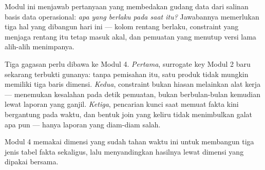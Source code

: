 Modul ini menjawab pertanyaan yang membedakan gudang data dari salinan basis
data operasional: \emph{apa yang berlaku pada saat itu?} Jawabannya memerlukan
tiga hal yang dibangun hari ini --- kolom rentang berlaku, constraint yang
menjaga rentang itu tetap masuk akal, dan pemuatan yang menutup versi lama alih-alih
menimpanya.

Tiga gagasan perlu dibawa ke Modul 4. \emph{Pertama}, surrogate key Modul 2 baru
sekarang terbukti gunanya: tanpa pemisahan itu, satu produk tidak mungkin
memiliki tiga baris dimensi. \emph{Kedua}, constraint bukan hiasan melainkan
alat kerja ---  menemukan kesalahan pada detik pemuatan, bukan
berbulan-bulan kemudian lewat laporan yang ganjil. \emph{Ketiga}, pencarian
kunci saat memuat fakta kini bergantung pada waktu, dan bentuk join yang keliru
tidak menimbulkan galat apa pun --- hanya laporan yang diam-diam salah.

Modul 4 memakai dimensi yang sudah tahan waktu ini untuk membangun tiga jenis
tabel fakta sekaligus, lalu menyandingkan hasilnya lewat dimensi yang dipakai
bersama.
